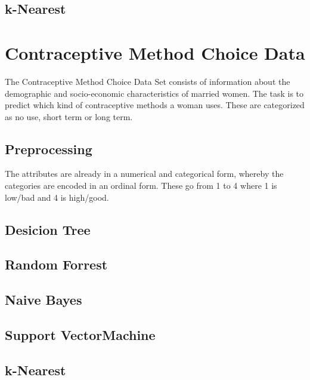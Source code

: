 \documentclass[paper=a4, fontsize=11pt]{scrartcl} %
\numberwithin{equation}{section} %
\numberwithin{figure}{section} %
\numberwithin{table}{section} %
\begin{document}
\subsection{k-Nearest}


\section{Contraceptive Method Choice Data}

The Contraceptive Method Choice Data Set consists of information about the demographic and socio-economic characteristics of married women. The task is to predict which kind of contraceptive methods a woman uses. These are categorized as no use, short term or long term.

\subsection{Preprocessing}

The attributes are already in a numerical and categorical form, whereby the categories are encoded in an ordinal form. These go from 1 to 4 where 1 is low/bad and 4 is high/good.



\subsection{Desicion Tree}
\subsection{Random Forrest}
\subsection{Naive Bayes}
\subsection{Support VectorMachine}
\subsection{k-Nearest}




\end{document}
